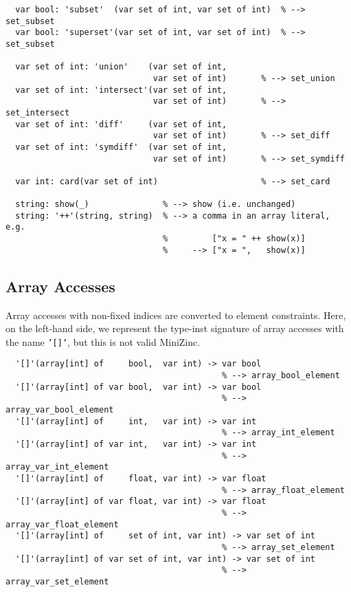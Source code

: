 \documentclass[10pt]{article}
\begin{document}
\begin{verbatim}
  var bool: 'subset'  (var set of int, var set of int)  % --> set_subset
  var bool: 'superset'(var set of int, var set of int)  % --> set_subset

  var set of int: 'union'    (var set of int,
                              var set of int)       % --> set_union
  var set of int: 'intersect'(var set of int,
                              var set of int)       % --> set_intersect
  var set of int: 'diff'     (var set of int,
                              var set of int)       % --> set_diff
  var set of int: 'symdiff'  (var set of int,
                              var set of int)       % --> set_symdiff

  var int: card(var set of int)                     % --> set_card

  string: show(_)               % --> show (i.e. unchanged)
  string: '++'(string, string)  % --> a comma in an array literal, e.g.
                                %         ["x = " ++ show(x)]
                                %     --> ["x = ",   show(x)]
\end{verbatim}

\subsection{Array Accesses}
     \label{Array Accesses}
Array accesses with non-fixed indices are converted to element
constraints.  Here, on the left-hand side, we represent the type-inst
signature of array accesses with the name \texttt{'[]'}, but this is not
valid MiniZinc.
\begin{verbatim}
  '[]'(array[int] of     bool,  var int) -> var bool
                                            % --> array_bool_element
  '[]'(array[int] of var bool,  var int) -> var bool
                                            % --> array_var_bool_element
  '[]'(array[int] of     int,   var int) -> var int
                                            % --> array_int_element
  '[]'(array[int] of var int,   var int) -> var int
                                            % --> array_var_int_element
  '[]'(array[int] of     float, var int) -> var float
                                            % --> array_float_element
  '[]'(array[int] of var float, var int) -> var float
                                            % --> array_var_float_element
  '[]'(array[int] of     set of int, var int) -> var set of int
                                            % --> array_set_element
  '[]'(array[int] of var set of int, var int) -> var set of int
                                            % --> array_var_set_element

\end{verbatim}
\end{document}
